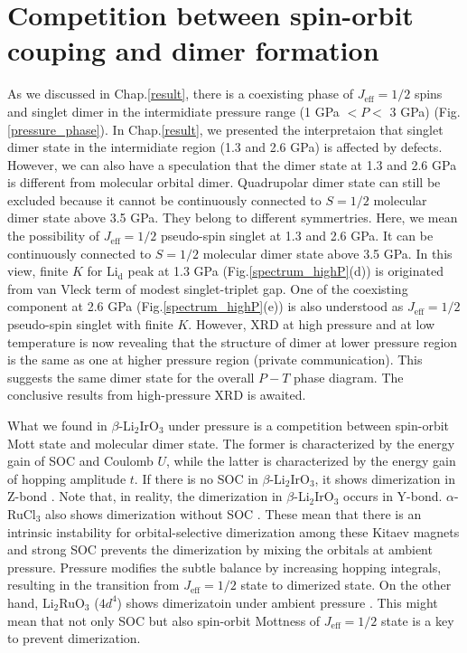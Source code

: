 \documentclass[a4,10.5pt]{report}
\begin{document}
\section{Competition between spin-orbit couping and dimer formation}
As we discussed in Chap.\ref{result}, there is a coexisting phase of $J_\mathrm{eff} = 1/2$ spins and singlet dimer in the intermidiate pressure range (1 GPa $< P <$ 3 GPa)
(Fig.\ref{pressure_phase}).
In Chap.\ref{result}, we presented the interpretaion that singlet dimer state in the intermidiate region (1.3 and 2.6 GPa) is affected by defects.
However, we can also have a speculation that the dimer state at 1.3 and 2.6 GPa is different from molecular orbital dimer.
Quadrupolar dimer state can still be excluded because it cannot be continuously connected to $S = 1/2$ molecular dimer state above 3.5 GPa.
They belong to different symmertries.
Here, we mean the possibility of $J_\mathrm{eff} = 1/2$ pseudo-spin singlet at 1.3 and 2.6 GPa.
It can be continuously connected to $S = 1/2$ molecular dimer state above 3.5 GPa.
In this view, finite $K$ for Li$_\mathrm{d}$ peak at 1.3 GPa (Fig.\ref{spectrum_highP}(d)) is originated from van Vleck term of modest singlet-triplet gap.
One of the coexisting component at 2.6 GPa (Fig.\ref{spectrum_highP}(e)) is also understood as $J_\mathrm{eff} = 1/2$ pseudo-spin singlet with finite $K$.
However, XRD at high pressure and at low temperature is now revealing that the structure of dimer at lower pressure region is the same as one at higher pressure region
(private communication).
This suggests the same dimer state for the overall $P-T$ phase diagram.
The conclusive results from high-pressure XRD is awaited.

What we found in $\beta$-Li$_2$IrO$_3$ under pressure is a competition between spin-orbit Mott state and molecular dimer state.
The former is characterized by the energy gain of SOC and Coulomb $U$, while the latter is characterized by the energy gain of hopping amplitude $t$.
If there is no SOC in $\beta$-Li$_2$IrO$_3$, it shows dimerization in Z-bond \cite{Kim2016}.
Note that, in reality, the dimerization in $\beta$-Li$_2$IrO$_3$ occurs in Y-bond.
$\alpha$-RuCl$_3$ also shows dimerization without SOC \cite{Kim2016a}.
These mean that there is an intrinsic instability for orbital-selective dimerization among these Kitaev magnets and strong SOC prevents the dimerization 
by mixing the orbitals at ambient pressure.
Pressure modifies the subtle balance by increasing hopping integrals, resulting in the transition from $J_\mathrm{eff} = 1/2$ state to dimerized state.
On the other hand, Li$_2$RuO$_3$ ($4d^4$) shows dimerizatoin under ambient pressure \cite{Miura2007}.
This might mean that not only SOC but also spin-orbit Mottness of $J_\mathrm{eff} = 1/2$ state is a key to prevent dimerization.
\end{document}
